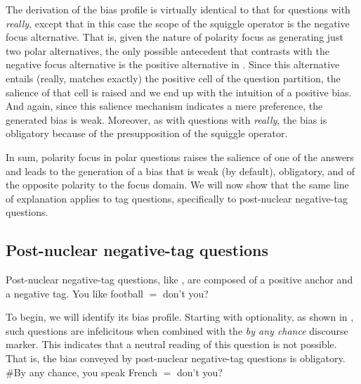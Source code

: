 \documentclass[output=paper,colorlinks,citecolor=brown]{langscibook}
\begin{document}
\noindent
The derivation of the bias profile is virtually identical to that for questions with \textit{really}, except that in this case the scope of the squiggle operator is the negative focus alternative. That is, given the nature of polarity focus as generating just two polar alternatives, the only possible antecedent that contrasts with the negative focus alternative is the positive alternative in . Since this alternative entails (really, matches exactly) the positive cell of the question partition, the salience of that cell is raised and we end up with the intuition of a positive bias. And again, since this salience mechanism indicates a mere preference, the generated bias is weak. Moreover, as with questions with \textit{really}, the bias is obligatory because of the presupposition of the squiggle operator.  

In sum, polarity focus in polar questions raises the salience of one of the answers and leads to the generation of a bias that is weak (by default), obligatory, and of the opposite polarity to the focus domain. We will now show that the same line of explanation applies to tag questions, specifically to post-nuclear negative-tag questions.

\subsection{Post-nuclear negative-tag questions}
Post-nuclear negative-tag questions, like , are composed of a positive anchor and a negative tag. 
\is{}
\ea You like football $=$ don't you?\label{Neg.PNu}
\z
{}

To begin, we will identify its bias profile. Starting with optionality, as shown in , such questions are infelicitous when combined with the \textit{by any chance} discourse marker. This indicates that a neutral reading of this question is not possible. That is,  the bias conveyed by  post-nuclear negative-tag questions is obligatory.
\is{}
\ea \#By any chance, you speak French $=$ don't you?\label{Neg.PNu.BAC}
\z
{}
\end{document}
